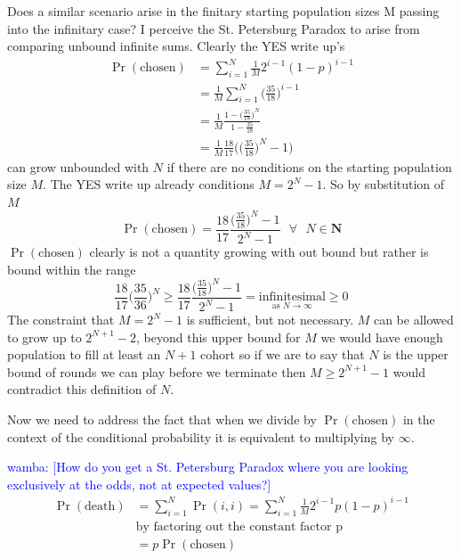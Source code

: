 \documentclass[article,twocolumn]{memoir}
\newcommand{\wamba} [1]{\ifnum\Chatty=1 \textcolor{blue}{wamba:  [#1]} \fi}
\begin{document}
\begin{itemize}
{        Does a similar scenario arise in the finitary starting population sizes M passing into the infinitary case?  I perceive the St. Petersburg Paradox to arise from comparing unbound infinite sums. Clearly the YES write up's 
        \begin{align*}
            \Pr(\text{chosen}) &= \sum_{i=1}^{N} \tfrac{1}{M} 2^{i-1}(1-p)^{i-1}\\
            &= \frac{1}{M} \sum_{i=1}^{N} \bigg(\frac{35}{18}\bigg)^{i-1}\\
            &= \frac{1}{M} \frac{1-\bigg(\frac{35}{18}\bigg)^{N}}{1-\frac{35}{18}}\\
            &= \frac{1}{M} \frac{18}{17}\bigg(\big(\frac{35}{18}\big)^N-1\bigg)
        \end{align*}
        can grow unbounded with $N$ if there are no conditions on the starting population size $M$.  The YES write up already conditions $M = 2^N-1$.  So by substitution of $M$
        $$\Pr(\text{chosen})= \frac{18}{17}\frac{\big(\frac{35}{18}\big)^N-1}{2^N-1} \text{  }\forall\text{  }N \in \mathbf{N}$$
        $\Pr(\text{chosen})$ clearly is not a quantity growing with out bound but rather is bound within the range 
        $$\frac{18}{17}\bigg(\frac{35}{36}\bigg)^N\geq \frac{18}{17}\frac{\big(\frac{35}{18}\big)^N-1}{2^N-1}  = \underset{\text{as }N\to\infty }{\text{infinitesimal}} \geq 0$$
        The constraint that $M = 2^N-1$ is sufficient, but not necessary. $M$ can be allowed to grow up to $2^{N+1}-2$, beyond this upper bound for $M$ we would have enough population to fill at least an $N+1$ cohort so if we are to say that $N$ is the upper bound of rounds we can play before we terminate then $M\geq 2^{N+1}-1$ would contradict this definition of $N$.

        Now we need to address the fact that when we divide by $\Pr(\text{chosen})$ in the context of the conditional probability it is equivalent to multiplying by $\infty$.

        \wamba{How do you get a St. Petersburg Paradox where you are looking exclusively at the odds, not at expected values?}
        \begin{align*}
            \Pr(\text{death})& = \sum_{i=1}^{N} \Pr(i,i)= \sum_{i=1}^{N} \tfrac{1}{M} 2^{i-1}p(1-p)^{i-1}\\
            & \text{by factoring out the constant factor p} \\
            & = p\Pr(\text{chosen})
        \end{align*}

}
\end{itemize}
\end{document}
